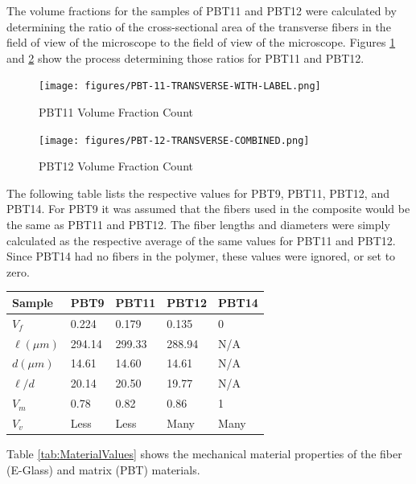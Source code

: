 \documentclass[11pt]{article}
\begin{document}
The volume fractions for the samples of PBT11 and PBT12 were calculated by determining the ratio of the cross-sectional area of the transverse fibers in the field of view of the microscope to the field of view of the microscope. Figures \ref{pbt11Vf} and \ref{pbt12Vf} show the process determining those ratios for PBT11 and PBT12.

\begin{figure}[H]
\centering
\texttt{[image: figures/PBT-11-TRANSVERSE-WITH-LABEL.png]}
\caption{PBT11 Volume Fraction Count}
\label{pbt11Vf}
\end{figure}
\begin{figure}[H]
\centering
\texttt{[image: figures/PBT-12-TRANSVERSE-COMBINED.png]}
\caption{PBT12 Volume Fraction Count}
\label{pbt12Vf}
\end{figure}

The following table lists the respective values for PBT9, PBT11, PBT12, and PBT14. For PBT9 it was assumed that the fibers used in the composite would be the same as PBT11 and PBT12. The fiber lengths and diameters were simply calculated as the respective average of the same values for PBT11 and PBT12.
Since PBT14 had no fibers in the polymer, these values were ignored, or set to zero.
\onehalfspacing
\begin{center}
 \label{tab:MeasuredValues}
\begin{tabular}{p{1.5cm} || p{} | p{} | p{} | p{}}
\hline
Sample & \multicolumn{1}{c|}{PBT9} & \multicolumn{1}{c|}{PBT11} & \multicolumn{1}{c|}{PBT12} & \multicolumn{1}{c}{PBT14} \\
\hline
\hline
\(V_f\) & 0.224 & 0.179 & 0.135 & 0\\
\(\ell (\mu m)\) & 294.14 & 299.33 & 288.94 & N/A\\
\(d (\mu m) \) & 14.61 & 14.60 & 14.61 & N/A\\
\(\ell /d\) & 20.14 & 20.50 & 19.77 & N/A\\
\(V_m\) & 0.78 & 0.82 & 0.86 & 1 \\
\(V_v\) & Less & Less & Many & Many\\
\hline
\end{tabular}
\end{center}
\singlespacing
\vspace{1em}

Table \ref{tab:MaterialValues} shows the mechanical material properties of the fiber (E-Glass) and matrix (PBT) materials. 
\end{document}
